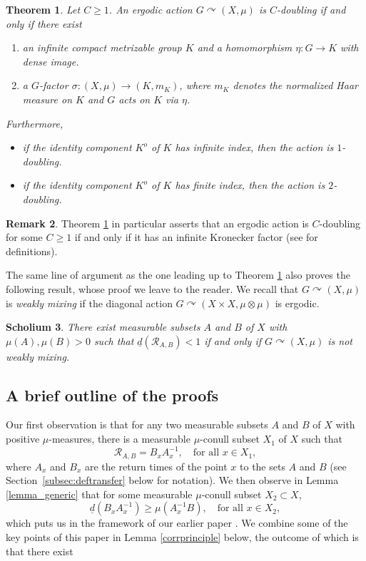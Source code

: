 \documentclass[JEP,XML,SOM,Unicode]{cedram}
\let\mathcal\mathscr
\newcommand{\cR}{\mathcal{R}}
\let\acts\curvearrowright
\theoremstyle{plain}
\newtheorem{theorem}{Theorem}[section]
\newtheorem{scholium}[theorem]{Scholium}
\theoremstyle{definition}
\newtheorem{remark}[theorem]{Remark}
\begin{document}
\begin{theorem}
\label{thm4}
Let $C \geq 1$. An ergodic action $G \acts (X,\mu)$ is $C$\nobreakdash-doubling if and only if there exist

\begin{enumerate}
\item
an infinite compact metrizable group $K$ and a homomorphism $\eta : G \to K$ with dense image.
\item
a $G$-factor $\sigma : (X,\mu) \to (K,m_K)$, where $m_K$ denotes the normalized Haar measure on $K$
and $G$ acts on $K$ via $\eta$.
\end{enumerate}
Furthermore,

\begin{itemize}
\item if the identity component $K^o$ of $K$ has infinite index, then the action is $1$\nobreakdash-doubling.

\item if the identity component $K^o$ of $K$ has finite index, then the action is $2$\nobreakdash-doubling.
\end{itemize}
\end{theorem}

\begin{remark}
Theorem \ref{thm4} in particular asserts that an ergodic action is $C$\nobreakdash-doubling for some $C \geq 1$ if and only if it has an infinite Kronecker
factor (see \eg \cite{BF} for definitions).
\end{remark}

The same line of argument as the one leading up to Theorem \ref{thm4} also proves the following result, whose proof we leave to the reader.
We recall that $G \acts (X,\mu)$ is \emph{weakly mixing} if the diagonal action $G \acts (X \times X,\mu \otimes \mu)$ is ergodic.

\begin{scholium}
There exist measurable subsets $A$ and $B$ of $X$ with $\mu(A),\mu(B) > 0$ such that $\underline{d}(\cR_{A,B}) < 1$ if and only if $G \acts (X,\mu)$ is \emph{not}
weakly mixing.
\end{scholium}

\subsection{A brief outline of the proofs}

Our first observation is that for any two measurable subsets $A$ and $B$ of $X$ with positive $\mu$-measures, there is a measurable
$\mu$-conull subset $X_1$ of $X$ such that
\[
\cR_{A,B} = B_x A_x^{-1}, \quad \textrm{for all $x \in X_1$},
\]
where $A_x$ and $B_x$ are the return times of the point $x$ to the sets $A$ and $B$ (see Section~\ref{subsec:deftransfer} below for notation).
We then observe in Lemma \ref{lemma_generic} that for some measurable $\mu$-conull subset $X_2 \subset X$,
\[
\underline{d}(B_xA_x^{-1}) \geq \mu(A_x^{-1}B), \quad \textrm{for all $x \in X_2$},
\]
which puts us in the framework of our earlier paper \cite{BF}. We combine some of the key points of this paper in Lemma \ref{corrprinciple}
below, the outcome of which is that there exist
\end{document}
